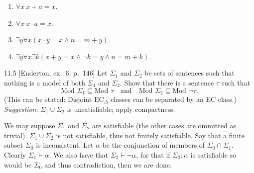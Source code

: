 \begin{enumerate}
  \item $\forall x\ x+a=x$.
  \item $\forall x\ x\cdot a=x$.
  \item $\exists y\forall x(x\cdot y=x\wedge n=m+y)$.
  \item $\exists y\forall x\exists k(x+y=x\wedge \neg k=y\wedge n=m+k)$.
\end{enumerate}

\begin{exercise}{11.5}
  [Enderton, ex.~6, p.~146]
  Let $\Sigma_1$ and $\Sigma_2$ be sets of sentences such that nothing is a model of both $\Sigma_1$ and $\Sigma_2$. Show that there is a sentence $\tau$ such that
  \[
    \text{Mod } \Sigma_1 \subseteq \text{Mod } \tau \quad \text{and} \quad \text{Mod } \Sigma_2 \subseteq \text{Mod } \lnot \tau.
  \]
  (This can be stated: Disjoint $\text{EC}_\Delta$ classes can be separated by an EC class.) \textit{Suggestion}: $\Sigma_1 \cup \Sigma_2$ is unsatisfiable; apply compactness.
\end{exercise}

We may suppose $\Sigma_1$ and $\Sigma_2$ are satisfiable (the other cases are ommitted as trivial). $\Sigma_1\cup \Sigma_2$ is not satisfiable, thus not finitely satisfiable. Say that a finite subset $\Sigma_0$ is inconsistent. Let $\alpha$ be the conjunction of members of $\Sigma_0\cap \Sigma_1$. Clearly $\Sigma_1\vdash \alpha$. We also have that $\Sigma_2\vdash \neg \alpha$, for that if $\Sigma_2;\alpha$ is satisfiable so would be $\Sigma_0$ and thus contradiction, then we are done.
